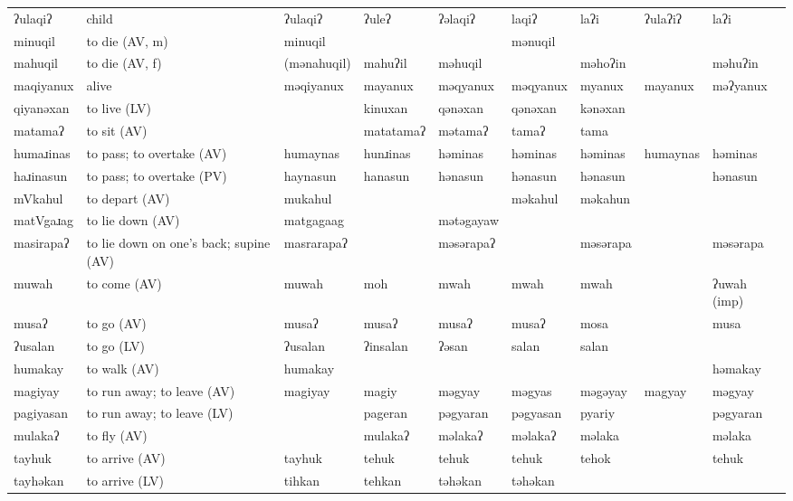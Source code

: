 \begin{landscape}
\begin{longtable}{*{9}{>{\raggedright\arraybackslash}p{}}}
\text{*}ʔulaqiʔ & child & ʔulaqiʔ & ʔuleʔ & ʔəlaqiʔ & laqiʔ & laʔi & ʔulaʔiʔ & laʔi\\
\text{*}minuqil & to die (AV, m) & minuqil &  &  & mənuqil &  &  & \\
\text{*}mahuqil & to die (AV, f) & (mənahuqil) & mahuʔil & məhuqil &  & məhoʔin &  & məhuʔin\\
\text{*}maqiyanux & alive & məqiyanux & mayanux & məqyanux & məqyanux & myanux & mayanux & məʔyanux\\
\text{*}qiyanəxan & to live (LV) &  & kinuxan & qənəxan & qənəxan & kənəxan &  & \\
\text{*}matamaʔ & to sit (AV) &  & matatamaʔ & mətamaʔ & tamaʔ & tama &  & \\
\text{*}humaɹinas & to pass; to overtake (AV) & humaynas & hunɹinas & həminas & həminas & həminas & humaynas & həminas\\
\text{*}haɹinasun & to pass; to overtake (PV) & haynasun & hanasun & hənasun & hənasun & hənasun &  & hənasun\\
\text{*}mVkahul & to depart (AV) & mukahul &  &  & məkahul & məkahun &  & \\
\text{*}matVgaɹag & to lie down (AV) & matgagaag &  & mətəgayaw &  &  &  & \\
\text{*}masirapaʔ & to lie down on one's back; supine (AV) & masrarapaʔ &  & məsərapaʔ &  & məsərapa &  & məsərapa\\
\text{*}muwah & to come (AV) & muwah & moh & mwah & mwah & mwah &  & ʔuwah (imp)\\
\text{*}musaʔ & to go (AV) & musaʔ & musaʔ & musaʔ & musaʔ & mosa &  & musa\\
\text{*}ʔusalan & to go (LV) & ʔusalan & ʔinsalan & ʔəsan & salan & salan &  & \\
\text{*}humakay & to walk (AV) & humakay &  &  &  &  &  & həmakay\\
\text{*}magiyay & to run away; to leave (AV) & magiyay & magiy & məgyay & məgyas & məgəyay & magyay & məgyay\\
\text{*}pagiyasan & to run away; to leave (LV) &  & pageran & pəgyaran & pəgyasan & pyariy &  & pəgyaran\\
\text{*}mulakaʔ & to fly (AV) &  & mulakaʔ & məlakaʔ & məlakaʔ & məlaka &  & məlaka\\
\text{*}tayhuk & to arrive (AV) & tayhuk & tehuk & tehuk & tehuk & tehok &  & tehuk\\
\text{*}tayhəkan & to arrive (LV) & tihkan & tehkan & təhəkan & təhəkan &  &  & \\

\end{longtable}
\end{landscape}
